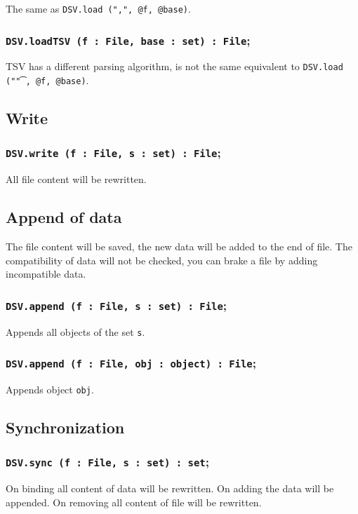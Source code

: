 The same as \texttt{DSV.load (",", @f, @base)}.

\subsubsection{\texttt{DSV.loadTSV (f : File, base : set) : File};}

TSV has a different parsing algorithm, is not the same equivalent to \texttt{DSV.load ("\t", @f, @base)}.

\subsection{Write}

\subsubsection{\texttt{DSV.write (f : File, s : set) : File};}

All file content will be rewritten.

\subsection{Append of data}

The file content will be saved, the new data will be added to the end of file. The compatibility of data will not be checked, you can brake a file by adding incompatible data.

\subsubsection{\texttt{DSV.append (f : File, s : set) : File};}

Appends all objects of the set \texttt{s}.

\subsubsection{\texttt{DSV.append (f : File, obj : object) : File};}

Appends object \texttt{obj}.

\subsection{Synchronization}

\subsubsection{\texttt{DSV.sync (f : File, s : set) : set};}

On binding all content of data will be rewritten. On adding the data will be appended. On removing all content of file will be rewritten.
